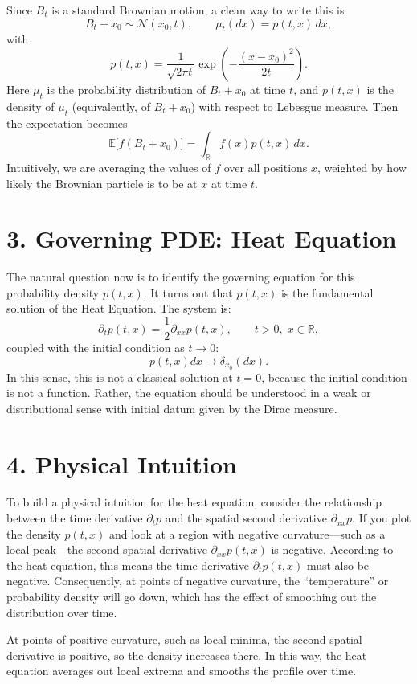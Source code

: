\documentclass[11pt]{article}
\theoremstyle{definition}
\theoremstyle{remark}
\begin{document}
Since $B_t$ is a standard Brownian motion, a clean way to write this is
\[
B_t+x_0\sim \mathcal N(x_0,t),\qquad \mu_t(dx)=p(t,x)\,dx,
\]
with
\[
p(t,x)=\frac{1}{\sqrt{2\pi t}}\exp\!\left(-\frac{(x-x_0)^2}{2t}\right).
\]
Here $\mu_t$ is the probability distribution of $B_t+x_0$ at time $t$, and $p(t,x)$ is the density of $\mu_t$ (equivalently, of $B_t+x_0$) with respect to Lebesgue measure.
Then the expectation becomes
\[
\mathbb{E}\bigl[f(B_t+x_0)\bigr]=\int_{\mathbb{R}} f(x)p(t,x)\,dx.
\]
Intuitively, we are averaging the values of $f$ over all positions $x$, weighted by how likely the Brownian particle is to be at $x$ at time $t$.

\section*{3. Governing PDE: Heat Equation}
The natural question now is to identify the governing equation for this probability density $p(t,x)$. It turns out that $p(t,x)$ is the fundamental solution of the Heat Equation. The system is:
\[
\partial_t p(t,x)=\frac{1}{2}\partial_{xx}p(t,x),\qquad t>0,\;x\in\mathbb{R},
\]
coupled with the initial condition as $t\to0$:
\[
p(t,x)dx\to\delta_{x_0}(dx).
\]
In this sense, this is not a classical solution at $t=0$, because the initial condition is not a function. Rather, the equation should be understood in a weak or distributional sense with initial datum given by the Dirac measure.

\section*{4. Physical Intuition}
To build a physical intuition for the heat equation, consider the relationship between the time derivative $\partial_t p$ and the spatial second derivative $\partial_{xx}p$. If you plot the density $p(t,x)$ and look at a region with negative curvature---such as a local peak---the second spatial derivative $\partial_{xx}p(t,x)$ is negative. According to the heat equation, this means the time derivative $\partial_t p(t,x)$ must also be negative. Consequently, at points of negative curvature, the ``temperature'' or probability density will go down, which has the effect of smoothing out the distribution over time.

At points of positive curvature, such as local minima, the second spatial derivative is positive, so the density increases there. In this way, the heat equation averages out local extrema and smooths the profile over time.
\end{document}
